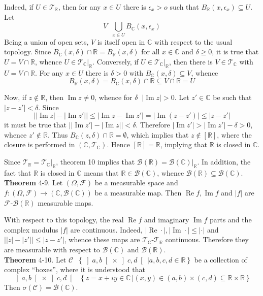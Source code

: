 \documentclass[a4paper]{article}
\newcommand{\obj}[1]{\left\{ #1 \right \}}
\newcommand{\clo}[1]{\left [ #1 \right ]}
\newcommand{\brac}[1]{\left ( #1 \right )}
\newcommand{\crab}[1]{\left ] #1 \right [}
\newcommand{\induc}[1]{\left . #1 \right \vert}
\newcommand{\abs}[1]{\left | #1 \right |}
\newcommand{\Real}{\mathbb{R}}
\newcommand{\Cplx}{\mathbb{C}}
\newcommand{\Tcal}{\mathcal{T}}
\newcommand{\Ccal}{\mathcal{C}}
\newcommand{\Fcal}{\mathcal{F}}
\newcommand{\borel}[1]{\mathcal{B}\brac{#1}}
\newcommand{\defn}{\mathop{\overset{\Delta}{=}}\nolimits}
\newcommand{\re}{\operatorname{Re}\nolimits}
\newcommand{\im}{\operatorname{Im}\nolimits}
\begin{document}
Indeed, if $U\in \Tcal_\Real$, then for any $x\in U$ there is $\epsilon_x>o$ such that $B_\Real\brac{x, \epsilon_x}\subseteq U$. Let \[V\defn \bigcup_{x\in U} B_\Cplx\brac{x, \epsilon_x}\] Being a union of open sets, $V$ is itself open in $\Cplx$ with respect to the usual topology. Since $B_\Cplx\brac{x, \delta}\cap \Real = B_\Real\brac{x, \delta}$ for all $x\in \Cplx$ and $\delta\geq 0$, it is true that $U = V\cap \Real$, whence $U\in\induc{\Tcal_\Cplx}_\Real$. Conversely, if $U\in\induc{\Tcal_\Cplx}_\Real$, then there is $V\in\Tcal_\Cplx$ with $U = V\cap \Real$. For any $x\in U$ there is $\delta>0$ with $B_\Cplx\brac{x, \delta}\subseteq V$, whence \[B_\Real\brac{x, \delta} = B_\Cplx\brac{x, \delta}\cap \Real\subseteq V\cap \Real = U\]

Now, if $z\notin \Real$, then $\im z\neq 0$, whence for $\delta\defn \abs{\im z}>0$. Let $z'\in \Cplx$ be such that $\abs{z-z'}<\delta$. Since \[\abs{ \abs{\im z} - \abs{\im z'} } \leq \abs{\im z-\im z'} = \abs{\im\brac{z-z'}} \leq \abs{z-z'}\] it must be true that $\abs{\abs{\im z'}-\abs{\im z}}<\delta$. Therefore $\abs{\im z'}>\abs{\im z'}-\delta>0$, whence $z'\notin \Real$. Thus $B_\Cplx\brac{z, \delta}\cap \Real = \emptyset$, which implies that $z\notin \clo{\Real}$, where the closure is performed in $\brac{\Cplx, \Tcal_\Cplx}$. Hence $\clo{\Real}=\Real$, implying that $\Real$ is closed in $\Cplx$.

Since $\Tcal_\Real=\induc{\Tcal_\Cplx}_\Real$, theorem 10 implies that $\borel{\Real} = \induc{\borel{\Cplx}}_\Real$. In addition, the fact that $\Real$ is closed in $\Cplx$ means that $\Real\in\borel{\Cplx}$, whence $\borel{\Real}\subseteq \borel{\Cplx}$.\\

\label{thm:cplx_func_meas} \noindent \textbf{Theorem} 4-9.
Let $\brac{\Omega, \Fcal}$ be a measurable space and $f:\brac{\Omega, \Fcal}\to\brac{\Cplx,\borel{\Cplx}}$ be a measurable map. Then $\re f, \im f$ and $\abs{f}$ are $\Fcal$-$\borel{\Real}$ measurable maps.

With respect to this topology, the real $\re f$ and imaginary $\im f$ parts and the complex modulus $\abs{f}$ are continuous. Indeed, $\abs{\re \cdot}, \abs{\im \cdot}\leq \abs{\cdot}$ and $\abs{\abs{z}-\abs{z'}}\leq \abs{z-z'}$, whence these maps are $\Tcal_\Cplx$-$\Tcal_\Real$ continuous. Therefore they are measurable with respect to $\borel{\Cplx}$ and $\borel{\Real}$.\\

\label{thm:cplx_sigma_algebra} \noindent \textbf{Theorem} 4-10.
Let $\Ccal \defn \obj{ \induc{ \crab{a,b}\times\crab{c,d}\, } a,b,c,d \in \Real}$ be a collection of complex ``boxes'', where it is understood that \[\crab{a,b}\times\crab{c,d} \defn \obj{ \induc{ z = x+iy\in \Cplx\, } \brac{x,y} \in \brac{a,b}\times\brac{c,d} \subseteq \Real\times\Real }\] Then $\sigma\brac{\Ccal} = \borel{\Cplx}$.
\end{document}

